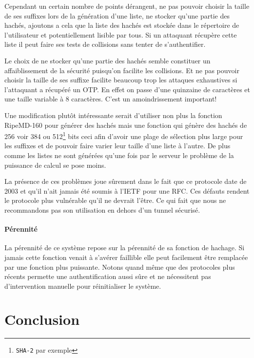 \documentclass{../res/univ-projet}
\begin{document}
        Cependant un certain nombre de points dérangent, ne pas pouvoir choisir
    la taille de ses suffixes lors de la génération d'une liste, ne stocker qu'une partie des hachés, ajoutons a 
    cela que la liste des hachés est stockée dans le répertoire de l'utilisateur et potentiellement lisible par tous.
    Si un attaquant récupère cette liste il peut faire ses tests de collisions sans tenter de s'authentifier.

        Le choix de ne stocker qu'une partie des hachés semble constituer un affaiblissement de la sécurité puisqu'on facilite
    les collisions. Et ne pas pouvoir choisir la taille de ses suffixe facilite beaucoup trop les attaques exhaustives
    si l'attaquant a récupéré un OTP. En effet on passe d'une quinzaine de caractères et une taille variable à 8 caractères.
    C'est un amoindrissement important!

        Une modification plutôt intéressante serait d'utiliser non plus la fonction RipeMD-160 pour générer des hachés mais
    une fonction qui génère des hachés de 256 voir 384 ou 512\footnote{\verb?SHA-2? par exemple} bits ceci afin d'avoir une
    plage de sélection plus large pour les suffixes et de pouvoir faire varier leur taille d'une liste à l'autre.
    De plus comme les listes ne sont générées qu'une fois par le serveur le problème de la puissance de calcul se pose moins.

        La présence de ces \og problèmes \fg{} joue sûrement dans le fait que ce protocole date de 2003 et qu'il n'ait jamais
    été soumis à l'IETF pour une RFC. Ces défauts rendent le protocole plus vulnérable qu'il ne devrait l'être. Ce qui fait
    que nous ne recommandons pas son utilisation en dehors d'un tunnel sécurisé.

\subsection{Pérennité}
    La pérennité de ce système repose sur la pérennité de sa fonction de hachage. Si jamais cette
    fonction venait à s'avérer faillible elle peut facilement être remplacée par une fonction plus
    puissante.
        Notons quand même que des protocoles plus récents permette une authentification aussi sûre
    et ne nécessitent pas d'intervention manuelle pour réinitialiser le système.

\setcounter{section}{0}
\part{Conclusion}
  
\end{document}
